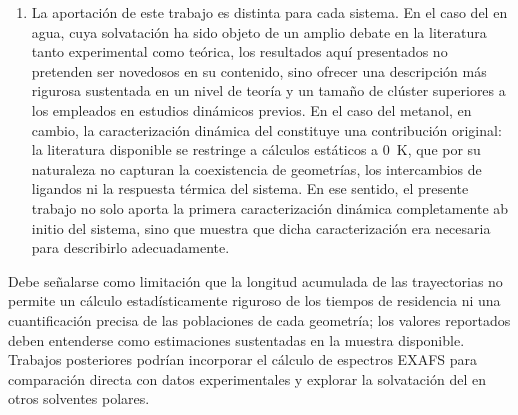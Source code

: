 \begin{enumerate}
    \item La aportación de este trabajo es distinta para cada sistema. En el caso del  en agua, cuya solvatación ha sido objeto de un amplio debate en la literatura tanto experimental como teórica, los resultados aquí presentados no pretenden ser novedosos en su contenido, sino ofrecer una descripción más rigurosa sustentada en un nivel de teoría y un tamaño de clúster superiores a los empleados en estudios dinámicos previos. En el caso del metanol, en cambio, la caracterización dinámica del  constituye una contribución original: la literatura disponible se restringe a cálculos estáticos a 0~K, que por su naturaleza no capturan la coexistencia de geometrías, los intercambios de ligandos ni la respuesta térmica del sistema. En ese sentido, el presente trabajo no solo aporta la primera caracterización dinámica completamente ab initio del sistema, sino que muestra que dicha caracterización era necesaria para describirlo adecuadamente.
\end{enumerate}

Debe señalarse como limitación que la longitud acumulada de las trayectorias no permite un cálculo estadísticamente riguroso de los tiempos de residencia ni una cuantificación precisa de las poblaciones de cada geometría; los valores reportados deben entenderse como estimaciones sustentadas en la muestra disponible. Trabajos posteriores podrían incorporar el cálculo de espectros EXAFS para comparación directa con datos experimentales y explorar la solvatación del  en otros solventes polares.